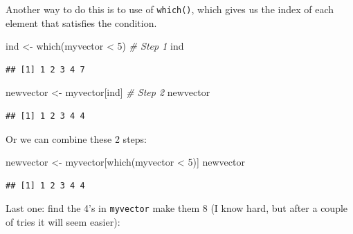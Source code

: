 \documentclass[
]{book}
\newenvironment{Shaded}{\begin{snugshade}}{\end{snugshade}}
\newcommand{\CommentTok}[1]{\textcolor[rgb]{0.56,0.35,0.01}{\textit{#1}}}
\newcommand{\DecValTok}[1]{\textcolor[rgb]{0.00,0.00,0.81}{#1}}
\newcommand{\FunctionTok}[1]{\textcolor[rgb]{0.00,0.00,0.00}{#1}}
\newcommand{\NormalTok}[1]{#1}
\newcommand{\OtherTok}[1]{\textcolor[rgb]{0.56,0.35,0.01}{#1}}
\newcommand{\SpecialCharTok}[1]{\textcolor[rgb]{0.00,0.00,0.00}{#1}}
\begin{document}
Another way to do this is to use of \texttt{which()}, which gives us the index of each element that satisfies the condition.

\begin{Shaded}
\begin{Highlighting}[]
\NormalTok{ind }\OtherTok{\textless{}{-}} \FunctionTok{which}\NormalTok{(myvector }\SpecialCharTok{\textless{}} \DecValTok{5}\NormalTok{)  }\CommentTok{\# Step 1}
\NormalTok{ind}
\end{Highlighting}
\end{Shaded}

\begin{verbatim}
## [1] 1 2 3 4 7
\end{verbatim}

\begin{Shaded}
\begin{Highlighting}[]
\NormalTok{newvector }\OtherTok{\textless{}{-}}\NormalTok{ myvector[ind]  }\CommentTok{\# Step 2}
\NormalTok{newvector}
\end{Highlighting}
\end{Shaded}

\begin{verbatim}
## [1] 1 2 3 4 4
\end{verbatim}

Or we can combine these 2 steps:

\begin{Shaded}
\begin{Highlighting}[]
\NormalTok{newvector }\OtherTok{\textless{}{-}}\NormalTok{ myvector[}\FunctionTok{which}\NormalTok{(myvector }\SpecialCharTok{\textless{}} \DecValTok{5}\NormalTok{)]}
\NormalTok{newvector}
\end{Highlighting}
\end{Shaded}

\begin{verbatim}
## [1] 1 2 3 4 4
\end{verbatim}

Last one: find the 4's in \texttt{myvector} make them 8 (I know hard, but after a couple of tries it will seem easier):
\end{document}
